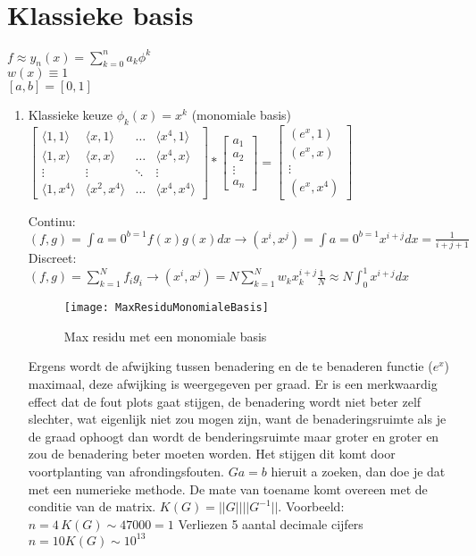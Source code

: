 \section{Klassieke basis}
$f \approx y_n(x)= \sum_{k=0}^n a_k \phi^k$ \\
$w(x) \equiv 1$ \\
$[a,b]=[0,1]$ 
\begin{enumerate}
\item Klassieke keuze $\phi_k(x)=x^k$ (monomiale basis) \\
${\begin{bmatrix}\langle 1,1\rangle &\langle x,1 \rangle &\dots &\langle x^4,1\rangle \\\langle 1,x\rangle &\langle x,x \rangle &\dots &\langle x^4,x\rangle \\\vdots &\vdots &\ddots &\vdots \\\langle 1,x^4\rangle &\langle x^2,x^4\rangle &\dots &\langle x^4,x^4 \rangle \end{bmatrix}} * \begin{bmatrix} a_1 \\ a_2 \\ \vdots \\ a_n \end{bmatrix} = \begin{bmatrix} (e^x,1) \\ (e^x,x) \\ \vdots \\ (e^x,x^4)    \end{bmatrix}  $

Continu: $(f,g)=\int{a=0}^{b=1} f(x)g(x) dx \rightarrow (x^i,x^j)= \int{a=0}^{b=1} x^{i+j}dx = \frac{1}{i+j+1}$ \\
Discreet: $(f,g)=\sum_{k=1}^N f_i g_i \rightarrow (x^i,x^j)= N \sum_{k=1}^N w_k x_k^{i+j}\frac{1}{N} \approx N \int_0^1 x^{i+j} dx$ \\



\begin{figure}[h]
	\centering
	\texttt{[image: MaxResiduMonomialeBasis]}
	\caption{Max residu met een monomiale basis}
\end{figure}
Ergens wordt de afwijking tussen benadering en de te benaderen functie ($e^x$) maximaal, deze afwijking is weergegeven per graad. Er is een merkwaardig effect dat de fout plots gaat stijgen, de benadering wordt niet beter zelf slechter, wat eigenlijk niet zou mogen zijn, want de benaderingsruimte als je de graad ophoogt dan wordt de benderingsruimte  maar groter en groter en zou de benadering beter moeten worden. Het stijgen dit komt door voortplanting van afrondingsfouten.
$Ga=b$ hieruit a zoeken, dan doe je dat met een numerieke methode. De mate van toename komt overeen met de conditie van de matrix. $K(G) = ||G||||G^{-1}||$. 
Voorbeeld: $n=4 \, K(G) \sim 47000=1$ Verliezen 5 aantal decimale cijfers \\ $n=10 K(G) \sim 10^{13}$ \\


\end{enumerate}
